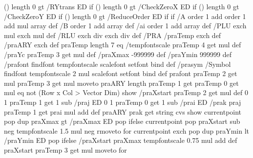 {{       (\psk@RYtrans) length 0 gt { {\psk@RYtrans\space} /RYtrans ED } if
       (\psk@CheckZeroX) length 0 gt { {\psk@CheckZeroX\space} /CheckZeroX ED } if
       (\psk@CheckZeroY) length 0 gt { {\psk@CheckZeroY\space} /CheckZeroY ED } if
       (\psk@ReduceOrder) length 0 gt { {\psk@ReduceOrder\space} /ReduceOrder ED } if } if %
  /A order 1 add order 1 add mul array def
  /B order 1 add array def
  /ai order 1 add array def
  /PLU {exch \pst@number\psxunit\space mul exch \pst@number\psyunit\space mul } def
  /RLU {exch \pst@number\psxunit\space div exch \pst@number\psyunit\space div } def
  /PRA { %
         /praTemp exch def /praARY exch def
         praTemp length 7 eq {%
         /tempfontscale \psk@fontscale praTemp 4 get mul def
         /praYc praTemp 3 get \pst@number\psyunit\space mul def
         /praXmax -999999 def
         /praYmin 999999 def
         /prafont {\psk@PSfont\space findfont tempfontscale scalefont setfont} bind def
         /prasym { /Symbol findfont tempfontscale 2 mul scalefont setfont} bind def
         prafont
         praTemp 2 get \pst@number\psxunit\space mul praTemp 3 get \pst@number\psyunit\space mul moveto
         praARY length praTemp 1 get praTemp 0 get mul eq not { (Row x Col > Vector Dim) show }{%
         /praXstart praTemp 2 get \pst@number\psxunit\space mul def
         0 1 praTemp 1 get 1 sub {/praj ED
         0 1 praTemp 0 get 1 sub {/prai ED /prak praj praTemp 1 get prai mul add def
         praARY prak get \psk@valuewidth string cvs show
         currentpoint pop dup praXmax gt { /praXmax ED }{ pop } ifelse
         currentpoint pop praXstart sub neg tempfontscale 1.5 mul neg rmoveto
         } for
         currentpoint exch pop dup praYmin lt { /praYmin ED }{ pop } ifelse
         /praXstart praXmax tempfontscale 0.75 mul add def
         praXstart praTemp 3 get \pst@number\psyunit\space mul moveto
         } for
}}}}

